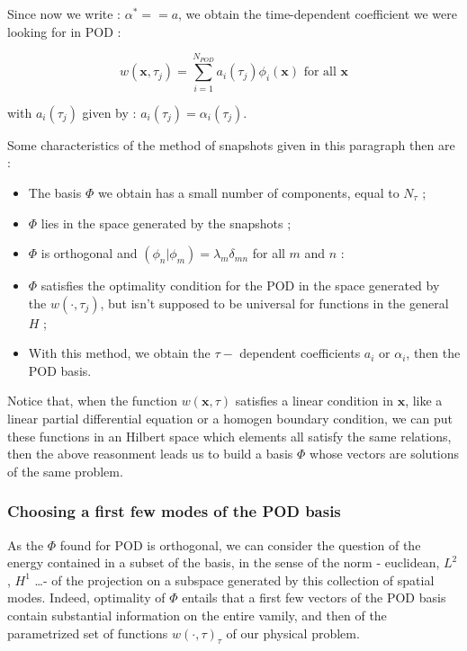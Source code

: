 Since now we write : $\alpha^{\ast}==a$, we obtain the time-dependent coefficient we were looking for in POD :

\[w(\mathbf{x},\tau_j)=\sum\limits_{i=1}^{N_{POD}}a_i(\tau_j)\phi_i(\mathbf{x})\text{ for all $\mathbf{x}$}\]

with $a_i(\tau_j)$ given by : $a_i(\tau_j)=\alpha_i (\tau_j)$.

\ligneinter
Some characteristics of the method of snapshots given in this paragraph then are :

\begin{itemize}
\item The basis $\Phi$ we obtain has a small number of components, equal to $N_{\tau}$ ;
\item $\Phi$ lies in the space generated by the snapshots ;
\item $\Phi$ is orthogonal and $(\phi_n |\phi_m)=\lambda_m\delta_{mn}$ for all $m$ and $n$ :
\item $\Phi$ satisfies the optimality condition for the POD in the space generated by the $w(\cdot , \tau_j)$, but isn't supposed to be universal for functions in the general $H$ ;
\item With this method, we obtain the $\tau-$ dependent coefficients $a_i$ or $\alpha_i$, then the POD basis. 
\end{itemize}

\ligneinter
Notice that, when the function $w(\mathbf{x},\tau)$ satisfies a linear condition in $\mathbf{x}$, %
like a linear partial differential equation or a homogen boundary condition, %
we can put these functions in an Hilbert space which elements all satisfy the same relations, %
then the above reasonment leads us to build a basis $\Phi$ whose vectors are solutions of the same problem.

\subsubsection{Choosing a first few modes of the POD basis}

As the $\Phi$ found for POD is orthogonal, we can consider the question of the energy contained in a subset of the basis, %
in the sense of the norm - euclidean, $L^2$, $H^1$ \dots - of the projection on a subspace generated by this collection of spatial modes. %
Indeed, optimality of $\Phi$ entails that a first few vectors of the POD basis contain substantial information on the entire vamily, %
and then of the parametrized set of functions $w(\cdot ,\tau)_{\tau}$ of our physical problem.


